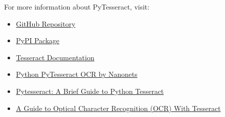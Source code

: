 For more information about PyTesseract, visit:
\begin{itemize}
	\item \href{https://github.com/madmaze/pytesseract}{GitHub Repository}
	\item \href{https://pypi.org/project/pytesseract/}{PyPI Package}
	\item \href{https://tesseract-ocr.github.io/}{Tesseract Documentation}
	\item \href{https://nanonets.com/blog/ocr-with-tesseract/}{Python PyTesseract OCR by Nanonets}
	\item \href{https://klearstack.com/pytesseract-a-brief-guide-to-python-tesseract/}{Pytesseract: A Brief Guide to Python Tesseract}
	\item \href{https://unstract.com/blog/guide-to-optical-character-recognition-with-tesseract-ocr/}{A Guide to Optical Character Recognition (OCR) With Tesseract}
	
	
	
\end{itemize}